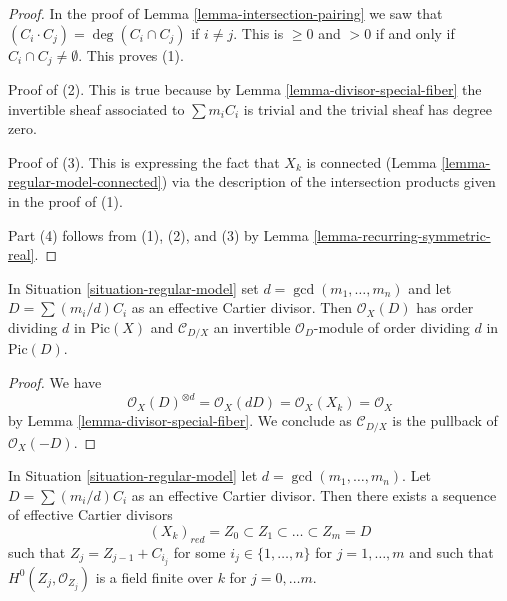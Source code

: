 \begin{proof}
In the proof of Lemma \ref{lemma-intersection-pairing} we saw that
$(C_i \cdot C_j) = \deg(C_i \cap C_j)$ if $i \not = j$. This is
$\geq 0$ and $> 0 $ if and only if $C_i \cap C_j \not = \emptyset$.
This proves (1).

\medskip\noindent
Proof of (2). This is true because by Lemma \ref{lemma-divisor-special-fiber}
the invertible sheaf associated to $\sum m_i C_i$
is trivial and the trivial sheaf has degree zero.

\medskip\noindent
Proof of (3). This is expressing the fact that $X_k$ is connected
(Lemma \ref{lemma-regular-model-connected})
via the description of the intersection products given in the proof of (1).

\medskip\noindent
Part (4) follows from (1), (2), and (3) by
Lemma \ref{lemma-recurring-symmetric-real}.
\end{proof}

\begin{lemma}
\label{lemma-multiple-fibre-normal-bundle}
In Situation \ref{situation-regular-model} set $d = \gcd(m_1, \ldots, m_n)$
and let $D = \sum (m_i/d)C_i$ as an effective Cartier divisor.
Then $\mathcal{O}_X(D)$ has order dividing $d$ in $\text{Pic}(X)$
and $\mathcal{C}_{D/X}$ an invertible $\mathcal{O}_D$-module
of order dividing $d$ in $\text{Pic}(D)$.
\end{lemma}

\begin{proof}
We have
$$
\mathcal{O}_X(D)^{\otimes d} = \mathcal{O}_X(dD) =
\mathcal{O}_X(X_k) = \mathcal{O}_X
$$
by Lemma \ref{lemma-divisor-special-fiber}.
We conclude as $\mathcal{C}_{D/X}$ is the pullback of
$\mathcal{O}_X(-D)$.
\end{proof}

\begin{lemma}
\label{lemma-regular-model-field}
\begin{reference}
\cite[Lemma 2.6]{Artin-Winters}
\end{reference}
In Situation \ref{situation-regular-model} let $d = \gcd(m_1, \ldots, m_n)$.
Let $D = \sum (m_i/d) C_i$ as an effective Cartier divisor. Then there exists
a sequence of effective Cartier divisors
$$
(X_k)_{red} = Z_0 \subset Z_1 \subset \ldots \subset Z_m = D
$$
such that $Z_j = Z_{j - 1} + C_{i_j}$ for some $i_j \in \{1, \ldots, n\}$
for $j = 1, \ldots, m$ and such that $H^0(Z_j, \mathcal{O}_{Z_j})$
is a field finite over $k$ for $j = 0, \ldots m$.
\end{lemma}

